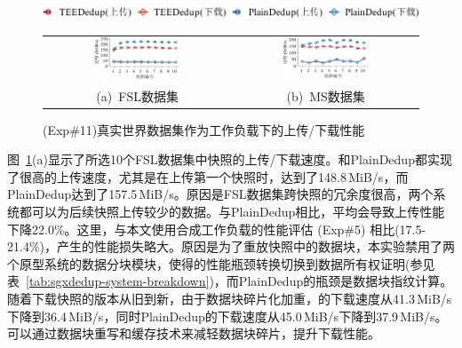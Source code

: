 \begin{figure}[!htb]
    \centering
    \includegraphics[height=11pt]{pic/sgxdedup/plot/exp_b2/expb2_trace_legend.pdf}
    \begin{tabular}{@{\ }c@{\ }c}
        \includegraphics[width=0.49\textwidth]{pic/sgxdedup/plot/exp_b2/expb2_trace_fsl_plain_sgx.pdf} & 
        \includegraphics[width=0.49\textwidth]{pic/sgxdedup/plot/exp_b2/expb2_trace_ms_plain_sgx.pdf}     \\
        \mbox{\small (a) FSL数据集}                                                                    & 
        \mbox{\small (b) MS数据集}
    \end{tabular}
    \caption{(Exp\#11)真实世界数据集作为工作负载下的上传/下载性能}
    \label{fig:sgxdedup-tracePerformance}
\end{figure}

图~\ref{fig:sgxdedup-tracePerformance}(a)显示了所选10个FSL数据集中快照的上传/下载速度。\sysnameS 和PlainDedup都实现了很高的上传速度，尤其是在上传第一个快照时，\sysnameS 达到了148.8\,MiB/s，而PlainDedup达到了157.5\,MiB/s。原因是FSL数据集跨快照的冗余度很高，两个系统都可以为后续快照上传较少的数据。与PlainDedup相比，\sysnameS 平均会导致上传性能下降22.0\%。这里，与本文使用合成工作负载的性能评估 (Exp\#5) 相比(17.5-21.4\%)，产生的性能损失略大。原因是为了重放快照中的数据块，本实验禁用了两个原型系统的数据分块模块，使得\sysnameS 的性能瓶颈转换切换到数据所有权证明(参见表~\ref{tab:sgxdedup-system-breakdown})，而PlainDedup的瓶颈是数据块指纹计算。随着下载快照的版本从旧到新，由于数据块碎片化\cite{lillibridge13}加重，\sysnameS 的下载速度从41.3\,MiB/s下降到36.4\,MiB/s，同时PlainDedup的下载速度从45.0\,MiB/s下降到37.9\,MiB/s。\sysnameS 可以通过数据块重写和缓存\cite{lillibridge13,cao2018ALACC}技术来减轻数据块碎片，提升下载性能。

